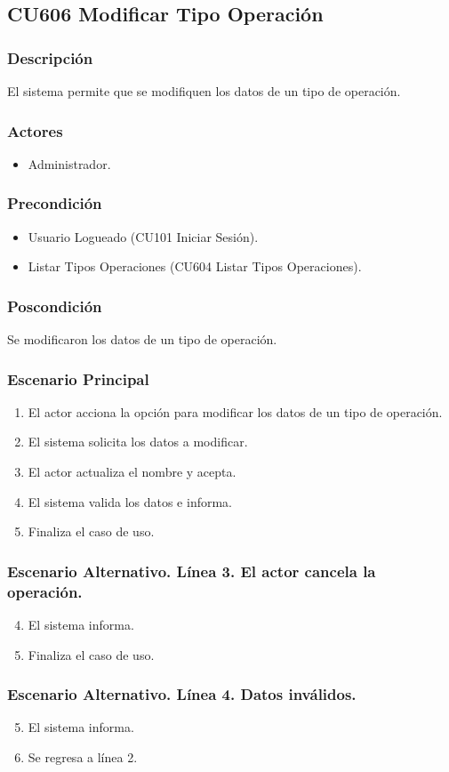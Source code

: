 \subsection{CU606 Modificar Tipo Operaci\'{o}n}
\subsubsection{Descripci\'{o}n}
El sistema permite que se modifiquen los datos de un tipo de operaci\'{o}n.
\subsubsection{Actores}
\begin{itemize}
\item Administrador.
\end{itemize}
\subsubsection{Precondici\'{o}n}
\begin{itemize}
\item Usuario Logueado (CU101 Iniciar Sesi\'{o}n).
\item Listar Tipos Operaciones (CU604 Listar Tipos Operaciones).
\end{itemize}
\subsubsection{Poscondici\'{o}n}
Se modificaron los datos de un tipo de operaci\'{o}n.
\subsubsection{Escenario Principal}
\begin{enumerate}
\item El actor acciona la opci\'{o}n para modificar los datos de un tipo de operaci\'{o}n.
\item El sistema solicita los datos a modificar.
\item El actor actualiza el nombre y acepta.
\item El sistema valida los datos e informa.
\item Finaliza el caso de uso.
\end{enumerate}
\subsubsection{Escenario Alternativo. L\'{i}nea 3. El actor cancela la operaci\'{o}n.}
\begin{enumerate}
\setcounter{enumi}{3}
\item El sistema informa.
\item Finaliza el caso de uso.
\end{enumerate}
\subsubsection{Escenario Alternativo. L\'{i}nea 4. Datos inv\'{a}lidos.}
\begin{enumerate}
\setcounter{enumi}{4}
\item El sistema informa.
\item Se regresa a l\'{i}nea 2.
\end{enumerate}